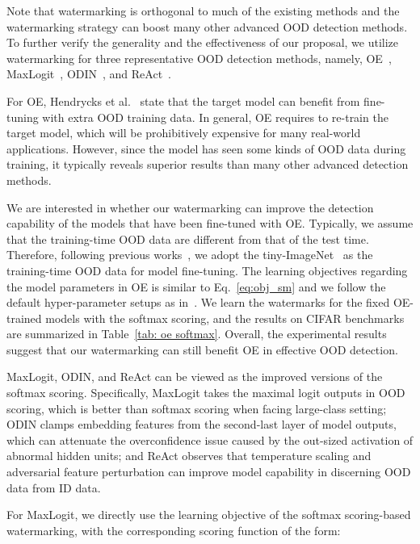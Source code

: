 \documentclass{article}
\begin{document}
Note that watermarking is orthogonal to much of the existing methods and the watermarking strategy can boost many other advanced OOD detection methods. To further verify the generality and the effectiveness of our proposal, we utilize watermarking for three representative OOD detection methods, namely, OE~\cite{HendrycksMD19}, MaxLogit~\cite{hendrycks2021improving}, ODIN~\cite{LiangLS18}, and ReAct~\cite{sun2021react}. 

For OE, Hendrycks et al.~\cite{HendrycksMD19} state that the target model can benefit from fine-tuning with extra OOD training data. In general, OE requires to re-train the target model, which will be prohibitively expensive for many real-world applications. However, since the model has seen some kinds of OOD data during training, it typically reveals superior results than many other advanced detection methods. 


We are interested in whether our watermarking can improve the detection capability of the models that have been fine-tuned with OE. Typically, we assume that the training-time OOD data are different from that of the test time. Therefore, following previous works~\cite{HendrycksMD19,liu2020energy}, we adopt the tiny-ImageNet~\cite{le2015tiny} as the training-time OOD data for model fine-tuning. The learning objectives regarding the model parameters in OE is similar to Eq.~\eqref{eq:obj_sm} and we follow the default hyper-parameter setups as in~\cite{HendrycksMD19}. We learn the watermarks for the fixed OE-trained models with the softmax scoring, and the results on CIFAR benchmarks are summarized in Table~\ref{tab: oe softmax}. Overall, the experimental results suggest that our watermarking can still benefit OE in effective OOD detection. 


MaxLogit, ODIN, and ReAct can be viewed as the improved versions of the softmax scoring. Specifically, MaxLogit takes the maximal logit outputs in OOD scoring, which is better than softmax scoring when facing large-class setting; ODIN clamps embedding features from the second-last layer of model outputs, which can attenuate the overconfidence issue caused by the out-sized activation of abnormal hidden units; and ReAct observes that temperature scaling and adversarial feature perturbation can improve model capability in discerning OOD data from ID data. 

{For MaxLogit, we directly use the learning objective of the softmax scoring-based watermarking, with the corresponding scoring function of the form:}
\end{document}

